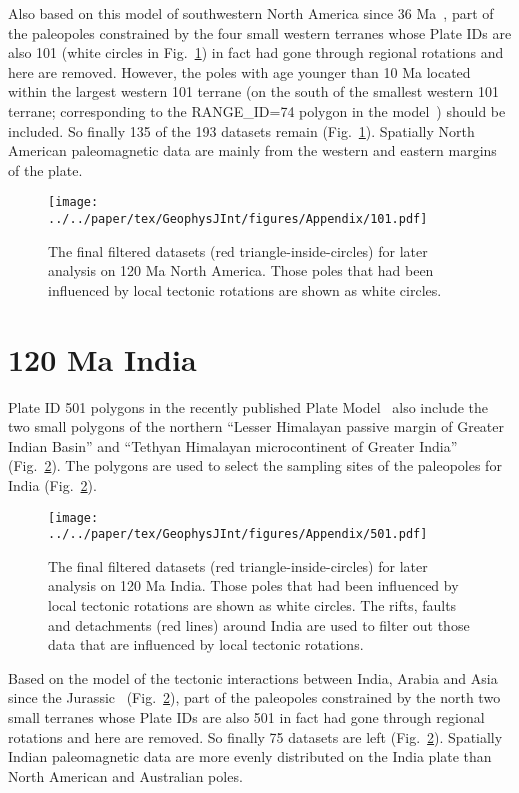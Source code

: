 Also based on this model of southwestern North America since 36 Ma~\citep{Mc06},
part of the paleopoles constrained by the four small western terranes whose
Plate IDs are also 101 (white circles in Fig.~\ref{fig_NAfinal}) in fact had gone through regional
rotations and here are removed. However, the poles with age younger than 10 Ma
located within the largest western 101 terrane (on the south of the smallest
western 101 terrane; corresponding to the RANGE\_ID=74 polygon in the
model~\citep{Mc06}) should be included. So finally 135 of the 193 datasets remain
(Fig.~\ref{fig_NAfinal}). Spatially North American paleomagnetic data are mainly
from the western and eastern margins of the plate.

\begin{figure}
\texttt{[image: ../../paper/tex/GeophysJInt/figures/Appendix/101.pdf]}
  \caption[Final filtered datasets for analysis on 120 Ma North
America]{The final filtered datasets (red triangle-inside-circles) for later
analysis on 120 Ma North America. Those poles that had been
influenced by local tectonic rotations are shown as white
circles.}\label{fig_NAfinal}
\end{figure}

\section{120 Ma India}

Plate ID 501 polygons in the recently published Plate Model~\citep{Y18} also
include the two small polygons of the northern ``Lesser Himalayan passive
margin of Greater Indian Basin'' and ``Tethyan Himalayan microcontinent of
Greater India'' (Fig.~\ref{fig_INfinal}). The polygons are used to select the
sampling sites of the paleopoles for India (Fig.~\ref{fig_INfinal}).

\begin{figure}
\texttt{[image: ../../paper/tex/GeophysJInt/figures/Appendix/501.pdf]}
\caption[Final filtered datasets for analysis on 120 Ma India]{The
final filtered datasets (red triangle-inside-circles) for later
analysis on 120 Ma India. Those poles that had been influenced by
local tectonic rotations are shown as white circles. The rifts, faults and
detachments (red lines) around India are used to filter out those data that
are influenced by local tectonic rotations.}\label{fig_INfinal}
\end{figure}

Based on the model of the tectonic interactions between India, Arabia and Asia
since the Jurassic~\citep{G15} (Fig.~\ref{fig_INfinal}), part of the paleopoles
constrained by the north two small terranes whose Plate IDs are also 501 in fact
had gone through regional rotations and here are removed. So finally 75 datasets
are left (Fig.~\ref{fig_INfinal}). Spatially Indian paleomagnetic data are more
evenly distributed on the India plate than North American and Australian poles.

